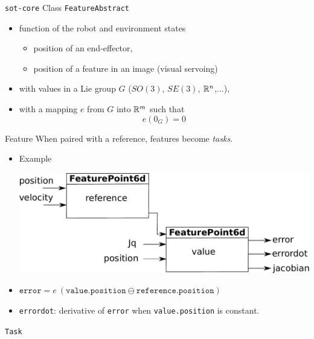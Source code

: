 %
%
\begin {frame} {\texttt{sot-core}}
Class \texttt {FeatureAbstract}
\begin{itemize}
\item function of the robot and environment states
  \pause
\begin{itemize}
  \item position of an end-effector,
  \item position of a feature in an image (visual servoing)
\end{itemize}
  \pause
\item with values in a Lie group $G$ ($SO(3)$, $SE(3)$, $\mathbb{R}^n$,...),
  \pause
\item with a mapping $e$ from $G$ into $\mathbb{R}^m$ such that
  $$ e (0_G) = 0$$
\end{itemize}
\end{frame}

%
%
\begin{frame} {Feature}
  When paired with a reference, features become \textit{tasks}.
  \begin{itemize}
    \item Example
      \centerline {
        \includegraphics [width=\linewidth]{figures/feature}
      }
      \pause
    \item $\texttt {error} = e\ (\texttt {value.position} \ominus \texttt {reference.position})$
      \pause
    \item \texttt{errordot}: derivative of \texttt {error} when \texttt{value.position} is constant.
  \end{itemize}
\end{frame}

%
% 
\begin{frame} {\texttt {Task}}
\end{frame}


